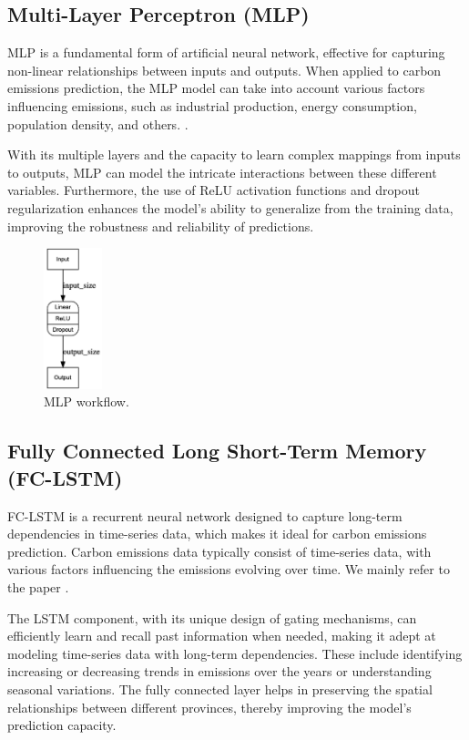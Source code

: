 \documentclass[sigconf, authordraft]{acmart}
\begin{document}
\subsection{Multi-Layer Perceptron (MLP)}


MLP is a fundamental form of artificial neural network, effective for capturing
non-linear relationships between inputs and outputs. When applied to carbon
emissions prediction, the MLP model can take into account various factors influencing
emissions, such as industrial production, energy consumption, population
density, and others. .

With its multiple layers and the capacity to learn complex mappings from inputs
to outputs, MLP can model the intricate interactions between these different
variables. Furthermore, the use of ReLU activation functions and dropout
regularization enhances the model's ability to generalize from the training
data, improving the robustness and reliability of predictions.

\begin{figure}[ht]
	\centering
	\includegraphics[width=0.15\textwidth]{figures/MLP_flow.png}
	\caption{MLP workflow.}
	\label{fig:MLP_flow}
\end{figure}

\subsection{Fully Connected Long Short-Term Memory (FC-LSTM)}


FC-LSTM is a recurrent neural network designed to capture long-term
dependencies in time-series data, which makes it ideal for carbon emissions prediction.
Carbon emissions data typically consist of time-series data, with various factors
influencing the emissions evolving over time. We mainly refer to the paper
\cite{tao2023-multiplea}.

The LSTM component, with its unique design of gating mechanisms, can
efficiently learn and recall past information when needed, making it adept at modeling
time-series data with long-term dependencies. These include identifying
increasing or decreasing trends in emissions over the years or understanding
seasonal variations. The fully connected layer helps in preserving the spatial
relationships between different provinces, thereby improving the model's
prediction capacity.
\end{document}
